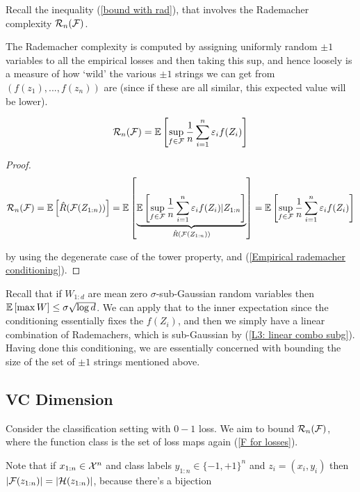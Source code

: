\documentclass[11pt]{scrartcl}
\begin{document}
Recall the inequality (\ref{bound with rad}), that involves the Rademacher complexity $\mathcal{R}_n(\mathcal{F})$.

The Rademacher complexity is computed by assigning uniformly random $\pm1$ variables to all the empirical losses and then taking this sup, and hence loosely is a measure of how `wild' the various $\pm1$ strings we can get from $(f(z_1), ... , f(z_n))$ are (since if these are all similar, this expected value will be lower).


\begin{theorem}
\begin{equation}
    \mathcal{R}_n(\mathcal{F}) = \mathbb{E} \left[  \sup_{f \in \mathcal{F}} \frac1n \sum_{i=1}^n \varepsilon_i f(Z_i) \right]
\end{equation}

\begin{proof}
\begin{equation}
    \mathcal{R}_n(\mathcal{F}) = \mathbb{E} \left[ \hat{R}(\mathcal{F}(Z_{1:n})) \right] = \mathbb{E} \left[  \underbrace{\mathbb{E} \left[  \sup_{f \in \mathcal{F}} \frac1n \sum_{i=1}^n \varepsilon_i f(Z_i) | Z_{1:n}  \right]}_{\hat{R}(\mathcal{F}(Z_{1:n}))} \right] = \mathbb{E} \left[  \sup_{f \in \mathcal{F}} \frac1n \sum_{i=1}^n \varepsilon_i f(Z_i) \right]
\end{equation}

by using the degenerate case of the tower property, and (\ref{Empirical rademacher conditioning}).
\end{proof}
\end{theorem}

Recall that if $W_{1:d}$ are mean zero $\sigma$-sub-Gaussian random variables then $\mathbb{E} \left[ \max W \right] \le \sigma \sqrt{\log d}$. We can apply that to the inner expectation since the conditioning essentially fixes the $f(Z_i)$, and then we simply have a linear combination of Rademachers, which is sub-Gaussian by (\ref{L3: linear combo subg}). Having done this conditioning, we are essentially concerned with bounding the size of the set of $\pm 1$ strings mentioned above. 

\subsection{VC Dimension}

Consider the classification setting with $0-1$ loss. We aim to bound $\mathcal{R}_n(\mathcal{F})$, where the function class is the set of loss maps again (\ref{F for losses}).

Note that if $x_{1:n} \in \mathcal{X}^n$ and class labels $y_{1:n} \in \{ -1, +1 \}^n$ and $z_i = (x_i, y_i)$ then $|\mathcal{F}(z_{1:n})| = |\mathcal{H}(z_{1:n})|$, because there's a bijection
\end{document}
